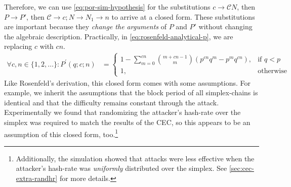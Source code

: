 Therefore, we can use \autoref{eq:por-sim-hypothesis} for the substitutions $c \to \mathcal{C}N$, then $P \to P'$, then $\mathcal{C} \to c; N \to N_1 \to n$ to arrive at a closed form.
These substitutions are important because they \emph{change the arguments} of $P$ and $P'$ without changing the algebraic description.
Practically, in \autoref{eq:rosenfeld-analytical-p}, we are replacing $c$ with $cn$.
\begin{align}
    \forall c, n \in \{1, 2, \dots\}: P^\prime(q; c; n) &= \begin{cases}
        1 - \sum_{m=0}^{c n} \binom{m+c n-1}{m}(p^{c n} q^m - p^m q^{c n}), & \text{if } q < p \\
        1, & \text{otherwise}
    \end{cases}
    \label{eq:cec-closed-1}
\end{align}
Like Rosenfeld's derivation, this closed form comes with some assumptions.
For example, we inherit the assumptions that the block period of all simplex-chains is identical and that the difficulty remains constant through the attack.
Experimentally we found that randomizing the attacker's hash-rate over the simplex was required to match the results of the CEC, so this appears to be an assumption of this closed form, too.\footnote{
    Additionally, the simulation showed that attacks were less effective when the attacker's hash-rate was \emph{uniformly} distributed over the simplex.
    See \autoref{sec:cec-extra-randhr} for more details.
}


